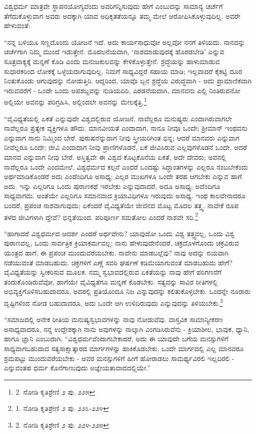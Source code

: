 ವಿಶ್ವಧರ್ಮ ಮಾತ್ರವೇ ಸ್ಥಾಪನಯೋಗ್ಯವೆಂದು ಅವರಿಗನ್ನಿಸುವುದು ಹೇಗೆ ಎಂಬುದನ್ನು ಸಾಮಾನ್ಯ ಚರ್ಚೆಗೆ ತೆಗೆದುಕೊಳ್ಳುವಾಗ ಅವರು ಅದಕ್ಕಾಗಿ ಯಾವ ಅಧಿಕೃತತೆಯನ್ನೂ ತಮ್ಮ ಮೇಲೆ ಆರೋಪಿಸಿಕೊಳ್ಳುವುದಿಲ್ಲ. ಅವರೇ ಹೇಳುವಂತೆ:

“ನನ್ನ ಬಳಿಯೂ ಸಣ್ಣದೊಂದು ಯೋಜನೆ ಇದೆ. ಅದು ಕಾರ್ಯಸಾಧುವೋ ಅಲ್ಲವೋ ನನಗೆ ತಿಳಿಯದು. ನಾನದನ್ನು ಚರ್ಚೆಗಾಗಿ ನಿಮ್ಮ ಮುಂದೆ ಇಡುತ್ತೇನೆ. ಮೊದಲನೆಯದಾಗಿ, ‘ನಾಶಮಾಡುವುದಕ್ಕೆ ಹೊರಡಬೇಡಿ’ ಎನ್ನುವ ಸೂತ್ರವಾಕ್ಯಕ್ಕೆ ಮನ್ನಣೆ ಕೊಡಿ ಎಂದು ಮನುಜಕುಲವನ್ನು ಕೇಳಿಕೊಳ್ಳುತ್ತೇನೆ. ಶ್ರದ್ಧೆಯನ್ನು ಹಾಳುಮಾಡುವ ಸುಧಾರಕರಿಂದ ಲೋಕಕ್ಕೆ ಒಳ್ಳೆಯದಾಗುವುದಿಲ್ಲ. ನಿಮಗೆ ಸಾಧ್ಯವಿದ್ದರೆ ಸಹಾಯ ಮಾಡಿ; ಇಲ್ಲವಾದರೆ ಕೈಕಟ್ಟಿ ದೂರ ನಿಂತುಕೊಂಡು ಆಗುವುದನ್ನು ನೋಡುತ್ತಿರಿ. ಆದ್ದರಿಂದ, ಯಾವೊ ಬ್ಬನ ಶ್ರದ್ಧೆಯ ವಿರುದ್ಧವಾಗಿ - ಅದು ಪ್ರಾಮಾಣಿಕವಾಗಿ ಇರುವವರೆಗೆ - ಒಂದೇ ಒಂದು ಅಪಶಬ್ದವನ್ನು ನುಡಿಯದಿರಿ, ಎರಡನೆಯದಾಗಿ, ಮಾನವನು ಎಲ್ಲಿ ನಿಂತಿರುವನೋ ಅಲ್ಲಿಯೇ ಅವನನ್ನು ಪರಿಗ್ರಹಿಸಿ, ಅಲ್ಲಿಂದಲೇ ಅವನನ್ನು ಮೇಲಕ್ಕೆತ್ತಿ.\footnote{2. ನೋಡಿ ಕೃತಿಶ್ರೇಣಿ ೨ ಪು. ೨೨೫}

“ವೈವಿಧ್ಯತೆಯಲ್ಲಿ ಏಕತೆ ಎನ್ನುವುದೇ ವಿಶ್ವದಲ್ಲಿರುವ ಯೋಜನೆ. ನಾವೆಲ್ಲರೂ ಮನುಷ್ಯರು ಎಂದಾಗಿರುವಾಗಲೇ ನಾವೆಲ್ಲರೂ ಪ್ರತ್ಯೇಕ ವ್ಯಕ್ತಿಗಳೂ ಹೌದು. ಮಾನವೀಯತೆ ಎಂದಾದಾಗ, ನಾನೂ ನೀವೂ ಒಂದೇ; ಶ‍್ರೀಮಾನ್ ಇಂಥವನು ಎನ್ನುವಾಗ ನಾನು ನಿಮ್ಮಿಂದ ಬೇರೆ. ಪುರುಷನೆನ್ನುವಾಗ ನೀವು ಸ್ತ್ರೀಯರಿಗಿಂತ ಭಿನ್ನ; ಆದರೆ ಮಾನವರು ಎನ್ನುವಾಗ ನೀವೆಲ್ಲರೂ ಒಂದೇ; ಜೀವಿ ಎಂದಾದಾಗ ನೀವು ಪ್ರಾಣಿಗಳೊಡನೆ, ಏಕೆ ಜೀವಿಸಿರುವ ಎಲ್ಲವುಗಳೊಡನೆ ಒಂದೇ, ಆದರೆ ಮಾನವ ಎನ್ನುವಾಗ ನೀವು ಬೇರೆ. ಅಸ್ತಿತ್ವವೇ ಈ ವಿಶ್ವದ ಕೊಟ್ಟಕೊನೆಯ ಏಕತೆ, ಅದೇ ದೇವರು; ಅವನಲ್ಲಿ ನಾವೆಲ್ಲರೂ ಒಂದೇ ಎಂದಮೇಲೆ, ವಿಶ್ವಧರ್ಮದ ಕಲ್ಪನೆ ಎಂದರೆ ಒಂದಷ್ಟು ಸಿದ್ಧಾಂತಗಳನ್ನು ಎಲ್ಲರೂ ನಂಬಬೇಕೆಂದು ಅರ್ಥಮಾಡಿಕೊಂಡರೆ ಅದು ಎಂದೆಂದಿಗೂ ಅಸಾಧ್ಯ; ಎಲ್ಲರ ಮುಖಗಳೂ ಒಂದೇ ತರಹ ಆಗಬೇಕು ಎನ್ನುವ ಹಾಗೆ ಅದು. ಇನ್ನು ಎಲ್ಲರಿಗೂ ಒಂದು ಪುರಾಣಕಥೆ ಇರಬೇಕು ಎನ್ನುವುದಾದರೆ, ಅದೂ ಅಸಾಧ್ಯ; ಅದೆಂದಿಗೂ ಸಾಧ್ಯವಾಗದು. ಅಂತೆಯೇ ಎಲ್ಲರಿಗೂ ಸಮಾನವಾದ ಕ್ರಿಯಾವಿಧಿಗಳೂ ಇರುವುದು ಅಸಾಧ್ಯ. ಇಂಥ ಕಾಲವೇನಾದರೂ ಬಂದರೆ, ಪ್ರಪಂಚ ನಾಶವಾಗುವುದು; ಏಕೆಂದರೆ ವೈವಿಧ್ಯತೆಯೇ ಜೀವನದ ಮೊಟ್ಟ ಮೊದಲ ತತ್ತ್ವ. ನಾವೇಕೆ ರೂಪ ತಳೆದ ಜೀವಿಗಳಾಗಿ ದ್ದೇವೆ? ಭಿನ್ನತೆಯಿಂದ. ಪರಿಪೂರ್ಣ ಸಮತೋಲ ಎಂದರೆ ನಾಶವೇ ಸರಿ.\footnote{1. ನೋಡಿ ಕೃತಿಶ್ರೇಣಿ ೨ ಪು. ೨೨೩-೨೨೪}

“ಹಾಗಾದರೆ ವಿಶ್ವಧರ್ಮದ ಆದರ್ಶ ಎಂದರೆ ಅರ್ಥವೇನು? ಯಾವುದೋ ಒಂದು ವಿಶ್ವ ತತ್ತ್ವವಲ್ಲ, ಒಂದು ವಿಶ್ವ ಪುರಾಣವಲ್ಲ, ಒಂದು ಸಾರ್ವತ್ರಿಕ ಕ್ರಿಯಾಕರ್ಮವಲ್ಲ; ನಾನು ಹೇಳುವುದೇನೆಂದರೆ, ಚಕ್ರದೊಳಗೊಂದು ಚಕ್ರವಿರುವ ಯಂತ್ರದ ಹಾಗೆ, ಈ ಪ್ರಪಂಚ ಮುಂದುವರೆಯಬೇಕು. ನಾವೇನು ಮಾಡಬಲ್ಲೆವು? ನಾವು ಅದನ್ನು ನಯವಾಗಿ ನಡೆಯುವಂತೆ ಮಾಡಬಹುದು. ಚಕ್ರಗಳಿಗೆ ಎಣ್ಣೆ ಸವರಿ ಘರ್ಷಣೆ ಕಡಿಮೆಯಾಗುವಂತೆ ಮಾಡಬಹುದು ಹೇಗೆ? ವೈವಿಧ್ಯತೆಯನ್ನು ಸ್ವೀಕರಿಸುವ ಮೂಲಕ. ನಮ್ಮ ಸ್ವಭಾವದಲ್ಲಿರುವ ಏಕತೆಯನ್ನು ನಾವು ಹೇಗೆ ಪರಿಗಣನೆಗೆ ತಂದುಕೊಂಡಿರುವೆವೋ, ಹಾಗೆಯೇ ವೈವಿಧ್ಯತೆಗೂ ಮನ್ನಣೆ ಕೊಡಬೇಕು. ಸತ್ಯವನ್ನು ಸಾವಿರ ರೀತಿಗಳಲ್ಲಿ ಅಭಿವ್ಯಕ್ತಿಗೊಳಿಸಬಹುದಾದರೂ, ಅದರಲ್ಲಿ ಪ್ರತಿಯೊಂದೂ ನಿಜ ಎನ್ನುವುದನ್ನು ಕಲಿತುಕೊಳ್ಳಬೇಕು. ಒಂದನ್ನೇ ನೂರಾರು ದೃಷ್ಟಿಗಳಿಂದ ನೋಡ ಬಹುದಾದರೂ, ಅದು ಒಂದೇ ಆಗಿ ಉಳಿದಿರುವುದು ಎನ್ನುವುದನ್ನು ತಿಳಿಯಬೇಕು.\footnote{2. ನೋಡಿ ಕೃತಿಶ್ರೇಣಿ ೨ ಪು. ೨೨೪-೨೨೫}

“ಸಮಾಜದಲ್ಲಿ ಅನೇಕ ರೀತಿಯ ಮನುಷ್ಯಸ್ವಭಾವಗಳನ್ನು ನಾವು ನೋಡುವೆವು. ವಾಸ್ತವಿಕ ಸಾಮಾನ್ಯೀಕರಣ ಅಸಾಧ್ಯವಾದರೂ, ನನ್ನ ಉದ್ದೇಶಕ್ಕಾಗಿ ನಾನು ಅವುಗಳನ್ನು ನಾಲ್ಕಾಗಿ ವಿಂಗಡಿಸಿರುವೆನು - ಕ್ರಿಯಾಶೀಲ, ಭಾವುಕ, ಧ್ಯಾನಿ, ಹಾಗೂ ಜ್ಞಾನಿ ಎಂಬುದಾಗಿ. “ವಿಶ್ವಧರ್ಮವೆಂದಾಗಬೇಕಾದರೆ, ಅದು ಈ ಯಾವುದೇ ಬಗೆಯ ಮನಸ್ಸುಗಳಿಗೆ ಸಾಧ್ಯವಾಗಬಹುದಾದ ಸತ್ಯಸಾಕ್ಷಾತ್ಕಾರದ ಮಾರ್ಗಗಳನ್ನು ಹಾಕಿಕೊಡಬೇಕು. ಒಂದೇ ಮಾರ್ಗದಲ್ಲಿ ಎಲ್ಲ ಮಾನವರೂ ಶ್ರಮಪಟ್ಟು ಮುಂದುವರೆಯಬೇಕು - ಅವರ ಮನಸ್ಸುಗಳಿಗೆ ಹೀಗೆ ಹೋರಾಡಲು ಸಾಮರ್ಥ್ಯವಿರಲಿ ಇಲ್ಲದಿರಲಿ - ಎನ್ನುವಂತಹ ಧರ್ಮ ಕೊನೆಗಾಣುವುದು ಅಜ್ಞೇಯತಾವಾದದಲ್ಲಿಯೇ.”

